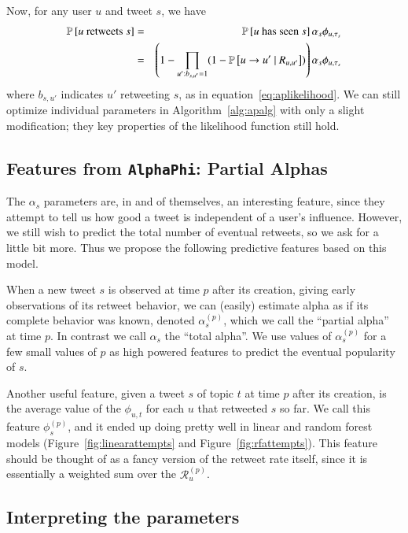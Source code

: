 Now, for any user $u$ and tweet $s$, we have
\begin{eqnarray}
  \mathbb{P} \left[\mbox{$u$ retweets $s$}\right] &=& \mathbb{P} \left[\mbox{$u$ has seen $s$}\right]\alpha_s\phi_{u,\tau_s}\nonumber\\
  &=&\left(1-\prod_{u':b_{s,u'}=1}(1-\mathbb{P} \left[u\to u'~|~R_{u,u'}\right])\right)\alpha_s\phi_{u,\tau_s} \label{eq:apeqfinal}
\end{eqnarray}
where $b_{s,u'}$ indicates $u'$ retweeting $s$, as in equation~\eqref{eq:aplikelihood}.  
We can still optimize individual parameters in Algorithm~\ref{alg:apalg} with only a slight modification; they key properties of the likelihood function still hold.  

\subsection{Features from \texttt{AlphaPhi}: Partial Alphas}

The $\alpha_s$ parameters are, in and of themselves, an interesting feature, since they attempt to tell us how good a tweet is independent of a user's influence.  However, we still wish to predict the total number of eventual retweets, so we ask for a little bit more.  
Thus we propose the following predictive features based on this model.     

\label{sec:apfeature}

When a new tweet $s$ is observed at time $p$ after its creation, giving early observations of its retweet behavior, we can (easily) estimate alpha as if its complete behavior was known, denoted $\alpha_s^{(p)}$, which we call the ``partial alpha'' at time $p$.  In contrast we call $\alpha_s$ the ``total alpha''.  
We use values of $\alpha_s^{(p)}$ for a few small values of $p$ as high powered features to predict the eventual popularity of $s$.

Another useful feature, given a tweet $s$ of topic $t$ at time $p$ after its creation, is the average value of the $\phi_{u,t}$ for each $u$ that retweeted $s$ so far.
We call this feature $\phi_s^{(p)}$, and it ended up doing pretty well in linear and random forest models (Figure~\ref{fig:linearattempts} and Figure~\ref{fig:rfattempts}).  This feature should be thought of as a fancy version of the retweet rate itself, since it is essentially a weighted sum over the $\mathcal{R}_u^{(p)}$.  

\subsection{Interpreting the parameters}


